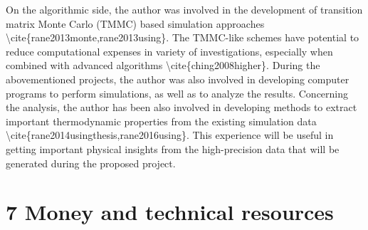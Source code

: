 \par On the algorithmic side, the author was involved in the development of transition matrix Monte Carlo (TMMC) based simulation approaches \textbackslash cite\{rane2013monte,rane2013using\}. The TMMC-like schemes have potential to reduce computational expenses in variety of investigations, especially when combined with advanced algorithms \textbackslash cite\{ching2008higher\}. During the abovementioned projects, the author was also involved in developing computer programs to perform simulations, as well as to analyze the results. Concerning the analysis, the author has been also involved in developing methods to extract important thermodynamic properties from the existing simulation data  \textbackslash cite\{rane2014usingthesis,rane2016using\}. This experience will be useful in getting important physical insights from the high-precision data that will be generated during the proposed project.\section{7 Money and technical resources}
